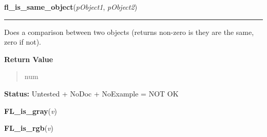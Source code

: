 \hspace{.8\funcindent}\begin{boxedminipage}{\funcwidth}

    \raggedright \textbf{fl\_is\_same\_object}(\textit{pObject1}, \textit{pObject2})

    \vspace{-1.5ex}

    \rule{\textwidth}{0.5\fboxrule}
\setlength{\parskip}{2ex}
    Does a comparison between two objects (returns non-zero is they are the
    same, zero if not).

\setlength{\parskip}{1ex}
      \textbf{Return Value}
    \vspace{-1ex}

      \begin{quote}
      num

      \end{quote}

\textbf{Status:} Untested + NoDoc + NoExample = NOT OK



    \end{boxedminipage}

    \label{xformslib:library:FL_is_gray}

    \vspace{0.5ex}

\hspace{.8\funcindent}\begin{boxedminipage}{\funcwidth}

    \raggedright \textbf{FL\_is\_gray}(\textit{v})

\setlength{\parskip}{2ex}
\setlength{\parskip}{1ex}
    \end{boxedminipage}

    \label{xformslib:library:FL_is_rgb}

    \vspace{0.5ex}

\hspace{.8\funcindent}\begin{boxedminipage}{\funcwidth}

    \raggedright \textbf{FL\_is\_rgb}(\textit{v})

\setlength{\parskip}{2ex}
\setlength{\parskip}{1ex}
    \end{boxedminipage}

